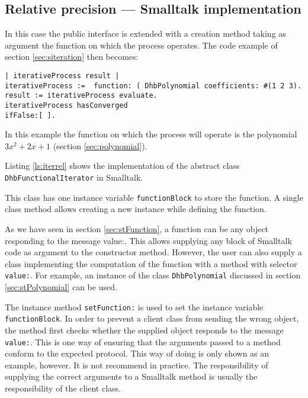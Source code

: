 \documentclass[twoside]{book}
\begin{document}
\subsection{Relative precision --- Smalltalk  implementation}
\label{sec:siterrel} In this case the public interface is extended
with a creation method taking as argument the function on which
the process operates. The code example of section
\ref{sec:siteration} then becomes:
\begin{codeExample}\break
 {\tt | iterativeProcess result |\\
 iterativeProcess := {\sl <a subclass of DhbFunctionalIterator>}
 function:
( DhbPolynomial coefficients: \#(1 2 3).\\ result :=
iterativeProcess evaluate.\\ iterativeProcess hasConverged\\
\hspace{4 em} ifFalse:[ {\sl <special case processing>}].
 }
\end{codeExample}
In this example the function on which the process will operate is
the polynomial $3x^2+2x+1$ (\cf section \ref{sec:polynomial}).

Listing \ref{ls:iterrel} shows the implementation of the abstract
class {\tt DhbFunctionalIterator} in Smalltalk.

This class has one instance variable {\tt functionBlock} to store
the function. A single class method allows creating a new instance
while defining the function.

As we have seen in section \ref{sec:stFunction}, a function can be
any object responding to the message value:. This allows supplying
any block of Smalltalk code as argument to the constructor method.
However, the user can also supply a class implementing the
computation of the function with a method with selector {\tt
value:}. For example, an instance of the class {\tt DhbPolynomial}
discussed in section \ref{sec:stPolynomial} can be used.

The instance method {\tt setFunction:} is used to set the instance
variable {\tt functionBlock}. In order to prevent a client class
from sending the wrong object, the method first checks whether the
supplied object responds to the message {\tt value:}. This is one
way of ensuring that the arguments passed to a method conform to
the expected protocol. This way of doing is only shown as an
example, however. It is not recommend in practice. The
responsibility of supplying the correct arguments to a Smalltalk
method is usually the responsibility of the client class.
\end{document}

